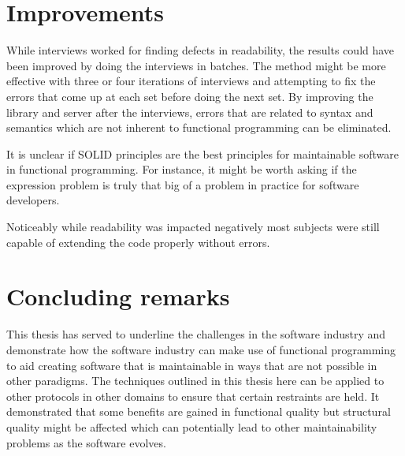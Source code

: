 \section{Improvements}

While interviews worked for finding defects in readability, the results could
have been improved by doing the interviews in batches. The method might be more
effective with three or four iterations of interviews and attempting to fix the
errors that come up at each set before doing the next set. By improving the
library and server after the interviews, errors that are related to syntax and
semantics which are not inherent to functional programming can be eliminated.

It is unclear if SOLID principles are the best principles for maintainable
software in functional programming. For instance, it might be worth asking if
the expression problem is truly that big of a problem in practice for software
developers.

Noticeably while readability was impacted negatively most subjects were still
capable of extending the code properly without errors.

\section{Concluding remarks}

This thesis has served to underline the challenges in the software industry and
demonstrate how the software industry can make use of functional programming to
aid creating software that is maintainable in ways that are not possible in
other paradigms. The techniques outlined in this thesis here can be applied to
other protocols in other domains to ensure that certain restraints are held.
It demonstrated that some benefits are gained in functional quality but structural
quality might be affected which can potentially lead to other maintainability
problems as the software evolves. 
